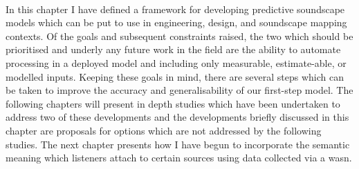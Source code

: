 \paragraph*{}
In this chapter I have defined a framework for developing predictive soundscape models which can be put to use in engineering, design, and soundscape mapping contexts. Of the goals and subsequent constraints raised, the two which should be prioritised and underly any future work in the field are the ability to automate processing in a deployed model and including only measurable, estimate-able, or modelled inputs. Keeping these goals in mind, there are several steps which can be taken to improve the accuracy and generalisability of our first-step model. The following chapters will present in depth studies which have been undertaken to address two of these developments and the developments briefly discussed in this chapter are proposals for options which are not addressed by the following studies. The next chapter presents how I have begun to incorporate the semantic meaning which listeners attach to certain sources using data collected via a \gls{wasn}.